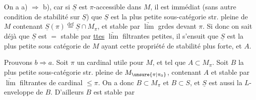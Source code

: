  On a a) $\Longrightarrow$ b),  car si $\underline S$ est $\pi$-accessible dans $M$, il est immédiat (sans autre condition de stabilité sur $\underline S$) que $\underline S$ est la plus petite sous-catégorie str. pleine de $M$ contenant $\underline S(\pi)\overset{\mathrm{def}}{=}\underline S\cap M_\pi$, et stable par $\underrightarrow{\lim}$ grdes devant $\pi$. Si donc on sait déjà que $\underline S$ est $=$ stable par \uline{ttes} $\underrightarrow{\lim}$ filtrantes petites, il s'ensuit que $\underline S$ est la plus petite sous catégorie de $M$ ayant cette propriété de stabilité plus forte, et  $A$.

Prouvons $b\Longrightarrow a$. Soit $\pi$ un cardinal utile pour $M$, et tel que $A\subset M_\pi$. Soit $B$ la plus petite sous-catégorie str. pleine de $M_{\unsure{\pi|\pi_0}}$,  contenant $A$ et stable par $\underrightarrow{\lim}$ filtrantes de cardinal $\leq\pi$. On a donc $B\subset M_\pi$ et $B\subset S$,  et $\underline S$ est aussi la $L$-enveloppe de $B$. D'ailleurs $B$ est stable par
